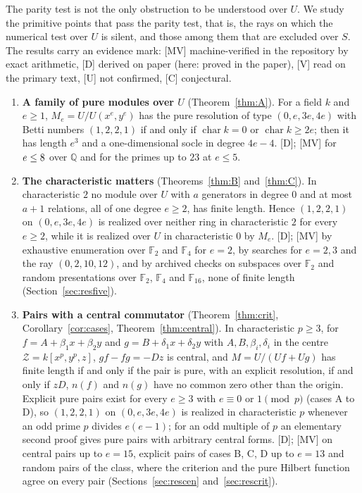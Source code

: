 \documentclass[11pt]{article}
\theoremstyle{definition}
\theoremstyle{remark}
\newcommand{\Q}{\mathbb{Q}}
\newcommand{\F}{\mathbb{F}}
\newcommand{\ch}{\operatorname{char}}
\begin{document}
The parity test is not the only obstruction to be understood over $U$. We study the primitive points that pass the parity test, that is, the rays on which the numerical test over $U$ is silent, and those among them that are excluded over $S$. The results carry an evidence mark: [MV] machine-verified in the repository by exact arithmetic, [D] derived on paper (here: proved in the paper), [V] read on the primary text, [U] not confirmed, [C] conjectural.
\begin{enumerate}
\item \textbf{A family of pure modules over $U$} (Theorem~\ref{thm:A}). For a field $k$ and $e\ge1$, $M_e=U/U(x^e,y^e)$ has the pure resolution of type $(0,e,3e,4e)$ with Betti numbers $(1,2,2,1)$ if and only if $\ch k=0$ or $\ch k\ge 2e$; then it has length $e^3$ and a one-dimensional socle in degree $4e-4$. [D]; [MV] for $e\le8$ over $\Q$ and for the primes up to $23$ at $e\le5$.
\item \textbf{The characteristic matters} (Theorems~\ref{thm:B} and~\ref{thm:C}). In characteristic $2$ no module over $U$ with $a$ generators in degree $0$ and at most $a+1$ relations, all of one degree $e\ge2$, has finite length. Hence $(1,2,2,1)$ on $(0,e,3e,4e)$ is realized over neither ring in characteristic $2$ for every $e\ge2$, while it is realized over $U$ in characteristic $0$ by $M_e$. [D]; [MV] by exhaustive enumeration over $\F_2$ and $\F_4$ for $e=2$, by searches for $e=2,3$ and the ray $(0,2,10,12)$, and by archived checks on \nfiveExhaustive{} subspaces over $\F_2$ and \nfiveRandom{} random presentations over $\F_2$, $\F_4$ and $\F_{16}$, none of finite length (Section~\ref{sec:resfive}).
\item \textbf{Pairs with a central commutator} (Theorem~\ref{thm:crit}, Corollary~\ref{cor:cases}, Theorem~\ref{thm:central}). In characteristic $p\ge3$, for $f=A+\beta_1x+\beta_2y$ and $g=B+\delta_1x+\delta_2y$ with $A,B,\beta_i,\delta_i$ in the centre $\mathcal Z=k[x^p,y^p,z]$, $gf-fg=-Dz$ is central, and $M=U/(Uf+Ug)$ has finite length if and only if the pair is pure, with an explicit resolution, if and only if $zD$, $n(f)$ and $n(g)$ have no common zero other than the origin. Explicit pure pairs exist for every $e\ge3$ with $e\equiv0$ or $1\pmod p$ (cases A to D), so $(1,2,2,1)$ on $(0,e,3e,4e)$ is realized in characteristic $p$ whenever an odd prime $p$ divides $e(e-1)$; for an odd multiple of $p$ an elementary second proof gives pure pairs with arbitrary central forms. [D]; [MV] on \ncenCases{} central pairs up to $e=15$, \ncritXCases{} explicit pairs of cases B, C, D up to $e=13$ and \ncritRandomPairs{} random pairs of the class, where the criterion and the pure Hilbert function agree on every pair (Sections~\ref{sec:rescen} and~\ref{sec:rescrit}).

\end{enumerate}
\end{document}
